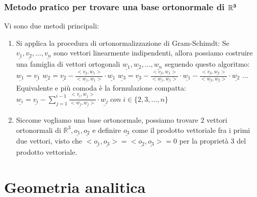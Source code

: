 \documentclass[12pt]{article}
\newenvironment{para}{\begin{adjustwidth}{13mm}{}}{\end{adjustwidth}}
\begin{document}
\begin{para}
\subsubsection{Metodo pratico per trovare una base ortonormale di $\bold{\mathbb{R}^3}$}
Vi sono due metodi principali: \begin{enumerate}
    \item Si applica la procedura di ortonormalizzazione di Gram-Schimdt: Se $\underline{v_1}, \underline{v_2}, ..., \underline{v_n}$ sono vettori linearmente indipendenti, allora possiamo costruire una famiglia di vettori ortogonali $\underline{w_1}, \underline{w_2}, ..., \underline{w_n}$ seguendo questo algoritmo: \newline
    $\underline{w_1} = \underline{v_1}$ \newline
    $\underline{w_2} = \underline{v_2} - \frac{<\underline{v_2}, \underline{w_1}>}{<\underline{w_1}, \underline{w_1}>}\cdot\underline{w_1}$ \newline
    $\underline{w_3} = \underline{v_3} - \frac{<\underline{v_3}, \underline{w_1}>}{<\underline{w_1}, \underline{w_1}>}\cdot\underline{w_1} - \frac{<\underline{v_3}, \underline{w_2}>}{<\underline{w_2}, \underline{w_2}>}\cdot\underline{w_2}$ \newline
    ...\newline
    Equivalente e più comoda è la formulazione compatta: \newline $\underline{w_i} = \underline{v_i} - \sum_{j=1}^{i-1} \frac{<\underline{v_i}, \underline{w_j}>}{<\underline{w_j}, \underline{w_j}>}\cdot\underline{w_j} \; con \; i\in\{2,3,...,n\}$
    \item Siccome vogliamo una base ortonormale, possiamo trovare 2 vettori ortonormali di $\mathbb{R}^3, \underline{o_1}, \underline{o_2}$ e definire $\underline{o_3}$ come il prodotto vettoriale fra i primi due vettori, visto che $<\underline{o_1}, \underline{o_3}> = <\underline{o_2}, \underline{o_3}> = 0$ per la proprietà 3 del prodotto vettoriale.
\end{enumerate}
\section{Geometria analitica}

\end{para}
\end{document}
